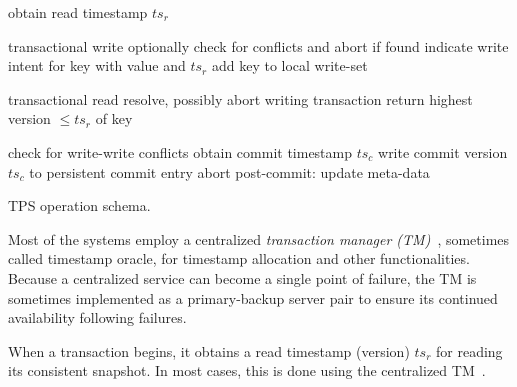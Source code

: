 \begin{algorithm}[tb]
\begin{algorithmic}[1]
{}
\State obtain read timestamp $ts_r$ 
\EndProcedure

 \Comment transactional write
\State optionally check for conflicts and abort if found 
\State indicate write intent for key with value and $ts_r$
\State add key to local write-set
\EndProcedure

 \Comment transactional read
	\State resolve, possibly abort writing transaction \label{l:resolve}
\EndIf
\State return highest version   $\le ts_r$ of key
\EndProcedure


\Statex \Comment check for write-write conflicts  \label{l:validate}
\State obtain commit timestamp $ts_c$
	\State write commit  version $ts_c$ to persistent commit entry \label{l:commit}
\Else
	\State abort	
\EndIf
\State post-commit: update meta-data
\EndProcedure

\end{algorithmic}
\caption{TPS operation schema.} 
\label{alg:schema}
\end{algorithm} 

Most of the systems employ a centralized \emph{transaction manager (TM)}~\cite{Percolator2010,OmidICDE2014,Omid2017,tephra},
 sometimes called timestamp oracle, for timestamp allocation and other functionalities. 
 Because a centralized service can become a single point of failure, the TM is sometimes implemented
 as a primary-backup server pair to ensure its continued availability following failures.

  When a transaction begins, it obtains a read timestamp (version) $ts_r$ for reading its consistent snapshot.
 In most cases, this is done using the centralized TM~\cite{Percolator2010,OmidICDE2014,Omid2017,tephra}. 

